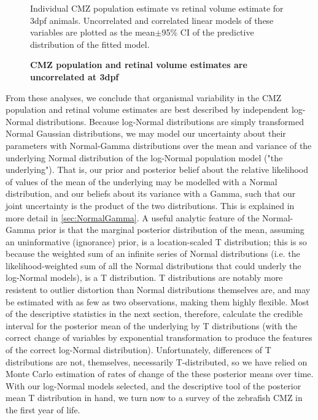 \begin{figure}[!h]
    \caption{{\bf CMZ population and retinal volume estimates are uncorrelated at 3dpf}}
    Individual CMZ population estimate vs retinal volume estimate for 3dpf animals. Uncorrelated and correlated linear models of these variables are plotted as the mean$\pm$95\% CI of the predictive distribution of the fitted model.
    \label{gausscorrelation}
\end{figure}

From these analyses, we conclude that organismal variability in the CMZ population and retinal volume estimates are best described by independent log-Normal distributions. Because log-Normal distributions are simply transformed Normal Gaussian distributions, we may model our uncertainty about their parameters with Normal-Gamma distributions over the mean and variance of the underlying Normal distribution of the log-Normal population model ("the underlying"). That is, our prior and posterior belief about the relative likelihood of values of the mean of the underlying may be modelled with a Normal distribution, and our beliefs about its variance with a Gamma, such that our joint uncertainty is the product of the two distributions. This is explained in more detail in \autoref{sec:NormalGamma}. A useful analytic feature of the Normal-Gamma prior is that the marginal posterior distribution of the mean, assuming an uninformative (ignorance) prior, is a location-scaled T distribution; this is so because the weighted sum of an infinite series of Normal distributions (i.e. the likelihood-weighted sum of all the Normal distributions that could underly the log-Normal models), is a T distribution. T distributions are notably more resistent to outlier distortion than Normal distributions themselves are, and may be estimated with as few as two observations, making them highly flexible. Most of the descriptive statistics in the next section, therefore, calculate the credible interval for the posterior mean of the underlying by T distributions (with the correct change of variables by exponential transformation to produce the features of the correct log-Normal distribution). Unfortunately, differences of T distributions are not, themselves, necessarily T-distributed, so we have relied on Monte Carlo estimation of rates of change of the these posterior means over time. With our log-Normal models selected, and the descriptive tool of the posterior mean T distribution in hand, we turn now to a survey of the zebrafish CMZ in the first year of life.

